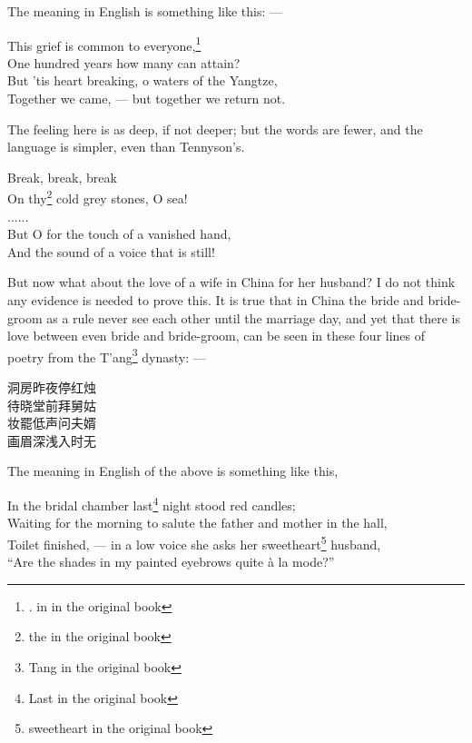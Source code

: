 The meaning in English is something like this: --- 
\begin{center}
    This grief is common to everyone,\footnote{. in in the original book}\\
    One hundred years how many can attain?\\
    But 'tis heart breaking, o waters of the Yangtze,\\
    Together we came, --- but together we return not.\\
\end{center}

The feeling here is as deep, if not deeper; but the words are fewer, and the language is simpler, even than Tennyson's.
\begin{center}
    Break, break, break\\
    On thy\footnote{the in the original book} cold grey stones, O sea!\\
               ......              \\
    But O for the touch of a vanished hand,\\
    And the sound of a voice that is still!
\end{center}

But now what about the love of a wife in China for her husband?
I do not think any evidence is needed to prove this.
It is true that in China the bride and bride-groom as a rule never see each other until the marriage day, and yet that there is love between even bride and bride-groom, can be seen in these four lines of poetry from the T'ang\footnote{Tang in the original book} dynasty: --- 
\begin{center}
      洞房昨夜停红烛\\
      待晓堂前拜舅姑\\
      妆罷低声问夫婿\\
      画眉深浅入时无
\end{center}

The meaning in English of the above is something like this,
\begin{center}
    In the bridal chamber last\footnote{Last in the original book} night stood red candles;\\
    Waiting for the morning to salute the father and mother in the hall,\\
    Toilet finished, --- in a low voice she asks her sweetheart\footnote{sweetheart in the original book} husband,\\
    ``Are the shades in my painted eyebrows quite \`a la mode?''
\end{center}

